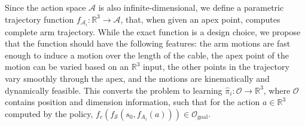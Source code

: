


Since the action space $\mathcal{A}$ is also infinite-dimensional, we define a parametric trajectory function $f_{\mathcal{A}_i} : \mathbb{R}^3 \rightarrow \mathcal{A}$, that, when given an apex point, computes complete arm trajectory. While the exact function is a design choice,
we propose that the function should have
the following features: the arm motions are fast enough to induce a motion over the length of the cable, the apex point of the motion can be varied based on an $\mathbb{R}^3$ input,  the other points in the trajectory vary smoothly through the apex, and the motions are kinematically and dynamically feasible. This converts the problem to learning $\hat\pi_i : \mathcal{O} \rightarrow \mathbb{R}^3$, where $\mathcal{O}$ contains position and dimension information, such that for the action $a \in \mathbb{R}^3$ computed by the policy, $f_c(f_\mathcal{S}(s_0, f_{A_i}(a))) \in \mathcal{O}_\mathrm{goal}$.



